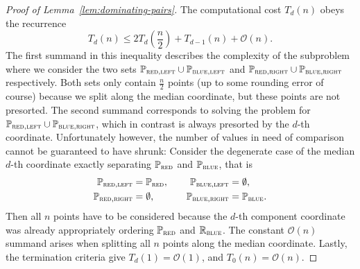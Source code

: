 \begin{proof}[Proof of Lemma~\ref{lem:dominating-pairs}]
    The computational cost $T_d(n)$ obeys the recurrence
    \begin{equation}\label{eq:recurrence}
        T_d(n) \leq 2 T_d\left( \frac{n}{2} \right) + T_{d - 1}(n) + \mathcal{O}(n).
    \end{equation}
    The first summand in this inequality describes the complexity of the subproblem where we consider the two sets $\mathbb{P}_{\textsc{red}, \textsc{left}} \cup \mathbb{P}_{\textsc{blue}, \textsc{left}}$ and $\mathbb{P}_{\textsc{red}, \textsc{right}} \cup \mathbb{P}_{\textsc{blue}, \textsc{right}}$ respectively.
    Both sets only contain $\frac{n}{2}$ points (up to some rounding error of course) because we split along the median coordinate, but these points are not presorted.
    The second summand corresponds to solving the problem for $\mathbb{P}_{\textsc{red}, \textsc{left}} \cup \mathbb{P}_{\textsc{blue}, \textsc{right}}$, which in contrast is always presorted by the $d$-th coordinate.
    Unfortunately however, the number of values in need of comparison cannot be guaranteed to have shrunk:
    Consider the degenerate case of the median $d$-th coordinate exactly separating $\mathbb{P}_{\textsc{red}}$ and $\mathbb{P}_{\textsc{blue}}$, that is
    \[
        \begin{split}
            \mathbb{P}_{\textsc{red}, \textsc{left}} &= \mathbb{P}_{\textsc{red}}, \\
            \mathbb{P}_{\textsc{red}, \textsc{right}} &= \emptyset,
        \end{split}
        \qquad
        \begin{split}
            \mathbb{P}_{\textsc{blue}, \textsc{left}} &= \emptyset, \\
            \mathbb{P}_{\textsc{blue}, \textsc{right}} &= \mathbb{P}_{\textsc{blue}}.
        \end{split}
    \]
    Then all $n$ points have to be considered because the $d$-th component coordinate was already appropriately ordering $\mathbb{P}_{\textsc{red}}$ and $\mathbb{R}_{\textsc{blue}}$.
    The constant $\mathcal{O}(n)$ summand arises when splitting all $n$ points along the median coordinate.
    Lastly, the termination criteria give $T_d(1) = \mathcal{O}(1)$, and $T_0(n) = \mathcal{O}(n)$.


\end{proof}
